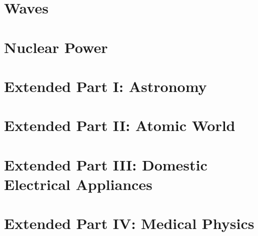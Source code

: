 \documentclass[12pt]{article}
\begin{document}
    \newpage
    \section{Waves}

    \newpage
    \section{Nuclear Power}

    \newpage
    \section{Extended Part I: Astronomy}

    \newpage
    \section{Extended Part II: Atomic World}

    \newpage
    \section{Extended Part III: Domestic Electrical Appliances}

    \newpage
    \section{Extended Part IV: Medical Physics}
\end{document}
